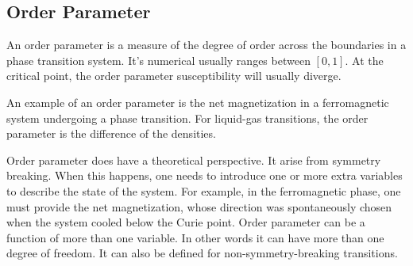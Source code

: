 		
	\subsection{Order Parameter}
	An order parameter is a measure of the degree of order across the boundaries in a phase transition system. It's numerical usually ranges between $[0,1]$. At the critical point, the order parameter susceptibility will usually diverge.
	
	An example of an order parameter is the net magnetization in a ferromagnetic system undergoing a phase transition. For liquid-gas transitions, the order parameter is the difference of the densities.
	
	Order parameter does have a theoretical perspective. It arise from symmetry breaking. When this happens, one needs to introduce one or more extra variables to describe the state of the system. For example, in the ferromagnetic phase, one must provide the net magnetization, whose direction was spontaneously chosen when the system cooled below the Curie point. Order parameter can be a function of more than one variable. In other words it can have more than one degree of freedom. It can also be defined for non-symmetry-breaking transitions. 

	

